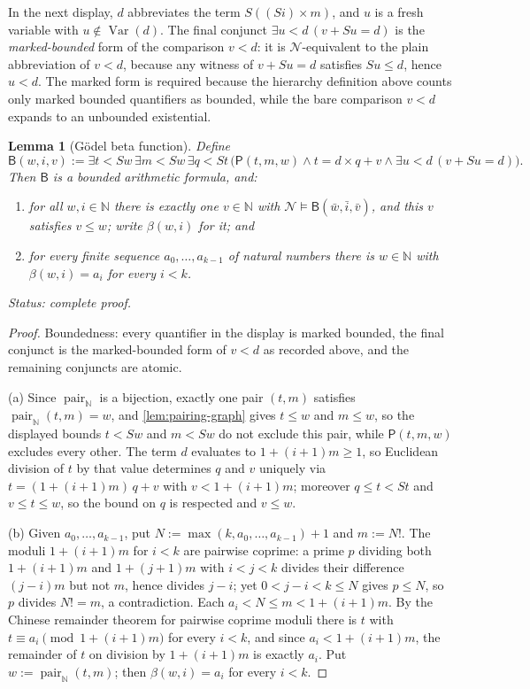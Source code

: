 \documentclass[11pt,oneside,openany]{book}
\theoremstyle{definition}
\theoremstyle{plain}
\newtheorem{lemma}[definition]{Lemma}
\theoremstyle{remark}
\newcommand{\N}{\mathbb{N}}
\newcommand{\entails}{\models}
\newcommand{\defeq}{\mathrel{:=}}
\begin{document}
In the next display, \(d\) abbreviates the term \(S((Si)\times m)\), and
\(u\) is a fresh variable with \(u\notin\operatorname{Var}(d)\).  The final
conjunct \(\exists u<d\,(v+Su=d)\) is the \emph{marked-bounded} form of the
comparison \(v<d\): it is \(\mathcal N\)-equivalent to the plain
abbreviation of \(v<d\), because any witness of \(v+Su=d\) satisfies
\(Su\leq d\), hence \(u<d\).  The marked form is required because the
hierarchy definition above counts only marked bounded quantifiers as
bounded, while the bare comparison \(v<d\) expands to an unbounded
existential.

\begin{lemma}[G\"odel beta function]
\label{lem:goedel-beta}
Define
\[
  \mathsf B(w,i,v)\defeq\exists t<Sw\,\exists m<Sw\,\exists q<St\,
  \bigl(\mathsf P(t,m,w)\land t=d\times q+v\land
  \exists u<d\,(v+Su=d)\bigr).
\]
Then \(\mathsf B\) is a bounded arithmetic formula, and:
\begin{enumerate}[label=(\alph*)]
\item for all \(w,i\in\N\) there is exactly one \(v\in\N\) with
      \(\mathcal N\entails\mathsf B(\bar w,\bar i,\bar v)\), and this
      \(v\) satisfies \(v\leq w\); write \(\beta(w,i)\) for it; and
\item for every finite sequence \(a_0,\ldots,a_{k-1}\) of natural numbers
      there is \(w\in\N\) with \(\beta(w,i)=a_i\) for every \(i<k\).
\end{enumerate}
\textit{Status: complete proof.}
\end{lemma}

\begin{proof}
Boundedness: every quantifier in the display is marked bounded, the final
conjunct is the marked-bounded form of \(v<d\) as recorded above, and the
remaining conjuncts are atomic.

(a) Since \(\operatorname{pair}_{\N}\) is a bijection, exactly one pair
\((t,m)\) satisfies \(\operatorname{pair}_{\N}(t,m)=w\), and
\cref{lem:pairing-graph} gives \(t\leq w\) and \(m\leq w\), so the
displayed bounds \(t<Sw\) and \(m<Sw\) do not exclude this pair, while
\(\mathsf P(t,m,w)\) excludes every other.  The term \(d\) evaluates to
\(1+(i+1)m\geq1\), so Euclidean division of \(t\) by that value determines
\(q\) and \(v\) uniquely via \(t=(1+(i+1)m)\,q+v\) with \(v<1+(i+1)m\);
moreover \(q\leq t<St\) and \(v\leq t\leq w\), so the bound on \(q\) is
respected and \(v\leq w\).

(b) Given \(a_0,\ldots,a_{k-1}\), put
\(N\defeq\max(k,a_0,\ldots,a_{k-1})+1\) and \(m\defeq N!\).  The moduli
\(1+(i+1)m\) for \(i<k\) are pairwise coprime: a prime \(p\) dividing both
\(1+(i+1)m\) and \(1+(j+1)m\) with \(i<j<k\) divides their difference
\((j-i)m\) but not \(m\), hence divides \(j-i\); yet \(0<j-i<k\leq N\)
gives \(p\leq N\), so \(p\) divides \(N!=m\), a contradiction.  Each
\(a_i<N\leq m<1+(i+1)m\).  By the Chinese remainder theorem for pairwise
coprime moduli there is \(t\) with \(t\equiv a_i\pmod{1+(i+1)m}\) for
every \(i<k\), and since \(a_i<1+(i+1)m\), the remainder of \(t\) on
division by \(1+(i+1)m\) is exactly \(a_i\).  Put
\(w\defeq\operatorname{pair}_{\N}(t,m)\); then \(\beta(w,i)=a_i\) for
every \(i<k\).
\end{proof}
\end{document}
